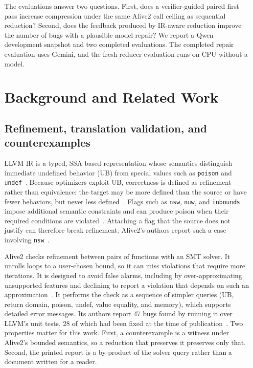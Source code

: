 \documentclass[conference]{IEEEtran}
\begin{document}
The evaluations answer two questions. First, does a verifier-guided paired first pass increase compression under the same Alive2 call ceiling as sequential reduction? Second, does the feedback produced by IR-aware reduction improve the number of bugs with a plausible model repair? We report a Qwen development snapshot and two completed evaluations. The completed repair evaluation uses Gemini, and the fresh reducer evaluation runs on CPU without a model.

\section{Background and Related Work}

\subsection{Refinement, translation validation, and counterexamples}

LLVM IR is a typed, SSA-based representation whose semantics distinguish immediate undefined behavior (UB) from special values such as \texttt{poison} and \texttt{undef}~\cite{lopes2021alive2,llvmlangref}. Because optimizers exploit UB, correctness is defined as refinement rather than equivalence: the target may be more defined than the source or have fewer behaviors, but never less defined~\cite{lopes2021alive2}. Flags such as \texttt{nsw}, \texttt{nuw}, and \texttt{inbounds} impose additional semantic constraints and can produce poison when their required conditions are violated~\cite{llvmlangref}. Attaching a flag that the source does not justify can therefore break refinement; Alive2's authors report such a case involving \texttt{nsw}~\cite{lopes2021alive2}.

Alive2 checks refinement between pairs of functions with an SMT solver. It unrolls loops to a user-chosen bound, so it can miss violations that require more iterations. It is designed to avoid false alarms, including by over-approximating unsupported features and declining to report a violation that depends on such an approximation~\cite{lopes2021alive2}. It performs the check as a sequence of simpler queries (UB, return domain, poison, undef, value equality, and memory), which supports detailed error messages. Its authors report 47 bugs found by running it over LLVM's unit tests, 28 of which had been fixed at the time of publication~\cite{lopes2021alive2}. Two properties matter for this work. First, a counterexample is a witness under Alive2's bounded semantics, so a reduction that preserves it preserves only that. Second, the printed report is a by-product of the solver query rather than a document written for a reader.
\end{document}
